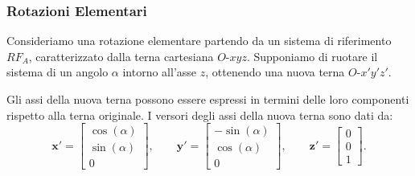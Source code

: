 ﻿\documentclass[11pt, a4paper]{article}
\begin{document}
\subsubsection{Rotazioni Elementari}

Consideriamo una rotazione elementare partendo da un sistema di riferimento $ RF_A $, caratterizzato dalla terna cartesiana $ O\text{-}xyz $. Supponiamo di ruotare il sistema di un angolo $\alpha$ intorno all'asse $z$, ottenendo una nuova terna $ O\text{-}x'y'z' $.

\begin{center}
    \qquad\qquad
\end{center}

Gli assi della nuova terna possono essere espressi in termini delle loro componenti rispetto alla terna originale. I versori degli assi della nuova terna sono dati da:
\[
\mathbf{x}' =
\begin{bmatrix}
    \cos(\alpha) \\
    \sin(\alpha) \\
    0
\end{bmatrix},
\qquad
\mathbf{y}' =
\begin{bmatrix}
    -\sin(\alpha) \\
    \cos(\alpha) \\
    0
\end{bmatrix},
\qquad
\mathbf{z}' =
\begin{bmatrix}
    0 \\
    0 \\
    1
\end{bmatrix}.
\]
\end{document}
